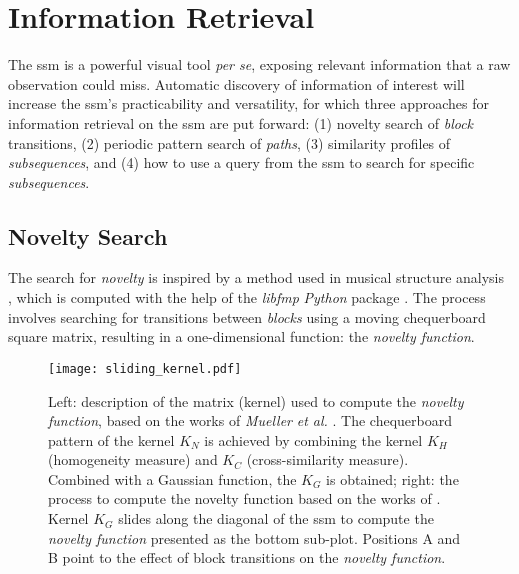 \section{Information Retrieval}

The \gls{ssm} is a powerful visual tool \textit{per se}, exposing relevant information that a raw observation could miss. Automatic discovery of information of interest will increase the \gls{ssm}'s practicability and versatility, for which three approaches for information retrieval on the \gls{ssm} are put forward: (1) novelty search of \textit{block} transitions, (2) periodic pattern search of \textit{paths}, (3) similarity profiles of \textit{subsequences}, and (4) how to use a query from the \gls{ssm} to search for specific \textit{subsequences}. 


\subsection{Novelty Search}
\label{sec:novelty_search}

The search for \textit{novelty} is inspired by a method used in musical structure analysis \cite{foote2000}, which is computed with the help of the \textit{libfmp} \textit{Python} package \cite{libfmp}. The process involves searching for transitions between \textit{blocks} using a moving chequerboard square matrix, resulting in a one-dimensional function: the \textit{novelty function}.


\begin{figure}
    \centering
    \texttt{[image: sliding\_kernel.pdf]}
    \caption{Left: description of the matrix (kernel) used to compute the \textit{novelty function}, based on the works of \textit{Mueller} \textit{et al.} \cite{fmp1, fmp2}. The chequerboard pattern of the kernel $K_N$ is achieved by combining the kernel $K_H$ (homogeneity measure) and $K_C$ (cross-similarity measure). Combined with a Gaussian function, the $K_G$ is obtained; right: the process to compute the novelty function based on the works of \cite{Dannenberg2008,fmp1, fmp2}. Kernel $K_G$ slides along the diagonal of the \gls{ssm} to compute the \textit{novelty function} presented as the bottom sub-plot. Positions A and B point to the effect of block transitions on the \textit{novelty function}.}
    \label{fig:kernel_description}
\end{figure}


